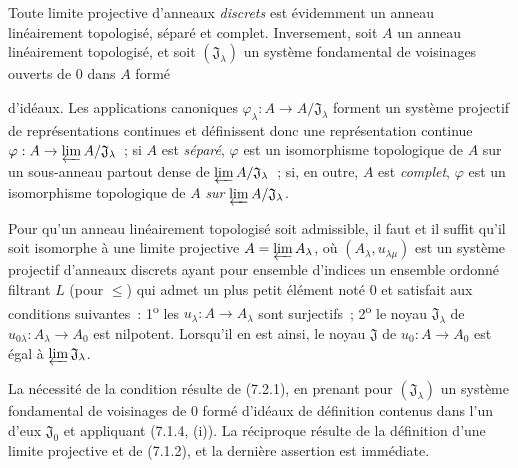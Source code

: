 \begin{env}[7.2.1]
\label{0.7.2.1-fr}
Toute limite projective d'anneaux \emph{discrets} est évidemment un anneau
linéairement topologisé, séparé et complet. Inversement, soit $A$ un anneau
linéairement topologisé, et soit $(\mathfrak J_\lambda)$ un système fondamental
de voisinages ouverts de $0$ dans $A$ formé


d'idéaux. Les applications canoniques
$\varphi_\lambda:A\to A/\mathfrak J_\lambda$ forment un système projectif de
représentations continues et définissent donc une représentation continue
$\varphi:A\to\varprojlim A/\mathfrak J_\lambda$~; si $A$ est \emph{séparé},
$\varphi$ est un isomorphisme topologique de $A$ sur un
sous-anneau partout dense de $\varprojlim A/\mathfrak J_\lambda$~; si, en
outre, $A$ est \emph{complet}, $\varphi$ est un isomorphisme topologique de $A$ \emph{sur}
$\varprojlim A/\mathfrak J_\lambda$.
\end{env}

\begin{lemma}[7.2.2]
\label{0.7.2.2-fr}
Pour qu'un anneau linéairement topologisé soit admissible, il faut et il suffit
qu'il soit isomorphe à une limite projective
$A=\varprojlim A_\lambda$, où $(A_\lambda,u_{\lambda\mu})$ est un système
projectif d'anneaux discrets ayant pour ensemble d'indices un ensemble ordonné
filtrant $L$ (pour $\leq$) qui admet un plus petit élément noté $0$ et satisfait
aux conditions suivantes~: 1\textsuperscript{o} les
$u_\lambda:A\to A_\lambda$ sont surjectifs~; 2\textsuperscript{o} le noyau
$\mathfrak J_\lambda$ de $u_{0\lambda}:A_\lambda\to A_0$ est nilpotent.
Lorsqu'il en est ainsi, le noyau $\mathfrak J$ de $u_0:A\to A_0$ est égal à
$\varprojlim\mathfrak J_\lambda$.
\end{lemma}

La nécessité de la condition résulte de (7.2.1), en prenant pour
$(\mathfrak J_\lambda)$ un système fondamental de voisinages de $0$ formé
d'idéaux de définition contenus dans l'un d'eux $\mathfrak J_0$ et appliquant
(7.1.4, (i)). La réciproque résulte de la définition d'une limite projective et
de (7.1.2), et la dernière assertion est immédiate.

